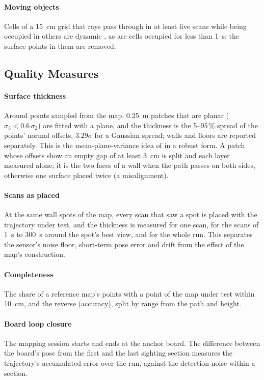 \paragraph{Moving objects} Cells of a \SI{15}{\centi\metre} grid that rays
pass through in at least five scans while being occupied in others are
dynamic \cite{dufomap}, as are cells occupied for less than
\SI{1}{\second}; the surface points in them are removed.

\subsection{Quality Measures}
\label{sec:supp_quality}
\paragraph{Surface thickness} Around points sampled from the map,
\SI{0.25}{\metre} patches that are planar ($\sigma_3<0.6\,\sigma_2$) are
fitted with a plane, and the thickness is the 5--95\,\% spread of the
points' normal offsets, $3.29\sigma$ for a Gaussian spread; walls and floors
are reported separately. This is the mean-plane-variance idea of
\cite{razlaw} in a robust form. A patch whose offsets show an empty gap of
at least \SI{3}{\centi\metre} is split and each layer measured alone; it is
the two faces of a wall when the path passes on both sides, otherwise one
surface placed twice (a misalignment).

\paragraph{Scans as placed} At the same wall spots of the map, every scan
that saw a spot is placed with the trajectory under test, and the thickness
is measured for one scan, for the scans of \SI{1}{\second} to
\SI{300}{\second} around the spot's best view, and for the whole run. This
separates the sensor's noise floor, short-term pose error and drift from
the effect of the map's construction.

\paragraph{Completeness} The share of a reference map's points with a point
of the map under test within \SI{10}{\centi\metre}, and the reverse
(accuracy), split by range from the path and height.

\paragraph{Board loop closure} The mapping session starts and ends at the
anchor board. The difference between the board's pose from the first and
the last sighting section measures the trajectory's accumulated error over
the run, against the detection noise within a section.

